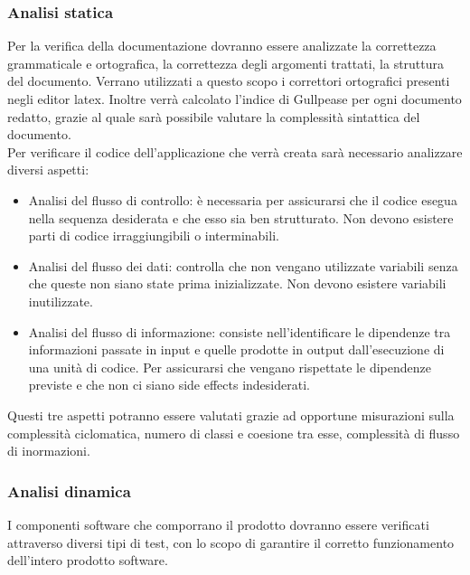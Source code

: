 \subsubsection{Analisi statica}
Per la verifica della documentazione dovranno essere analizzate la correttezza grammaticale e ortografica, la correttezza degli argomenti trattati, la struttura del documento. Verrano utilizzati a questo scopo i correttori ortografici presenti negli editor latex. Inoltre verrà calcolato l'indice di Gullpease per ogni documento redatto, grazie al quale sarà possibile valutare la complessità sintattica del documento.\\
Per verificare il codice dell'applicazione che verrà creata sarà necessario analizzare diversi aspetti:
\begin{itemize}
\item Analisi del flusso di controllo: è necessaria per assicurarsi che il codice esegua nella sequenza desiderata e che esso sia ben strutturato. Non devono esistere parti di codice irraggiungibili o interminabili.
\item Analisi del flusso dei dati: controlla che non vengano utilizzate variabili senza che queste non siano state prima inizializzate. Non devono esistere variabili inutilizzate. 
\item Analisi del flusso di informazione: consiste nell'identificare le dipendenze tra informazioni passate in input e quelle prodotte in output dall’esecuzione di una unità di codice. Per assicurarsi che vengano rispettate le dipendenze previste e che non ci siano side effects indesiderati.
\end{itemize}
Questi tre aspetti potranno essere valutati grazie ad opportune misurazioni sulla complessità ciclomatica, numero di classi e coesione tra esse, complessità di flusso di inormazioni.
\subsubsection{Analisi dinamica}
I componenti software che comporrano il prodotto dovranno essere verificati attraverso diversi tipi di test, con lo scopo di garantire il corretto funzionamento dell'intero prodotto software.